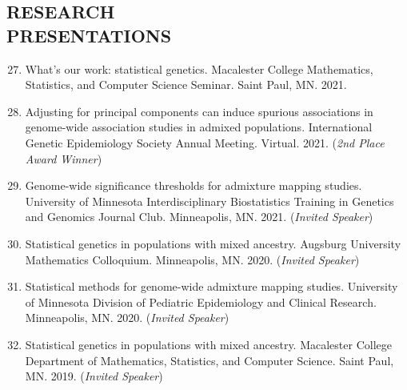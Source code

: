 \documentclass[margin]{res}
\newenvironment{benumerate}[1]{
    \let\oldItem\item
    \def\item{\addtocounter{enumi}{-2}\oldItem}
    
    \begin{enumerate}
    \setcounter{enumi}{#1}
    \addtocounter{enumi}{1}
}{
    \end{enumerate}
}
\begin{document}
\begin{resume}
\section{RESEARCH \\ PRESENTATIONS}

\begin{benumerate}{26} %


\item What's our work: statistical genetics. Macalester College Mathematics, Statistics, and Computer Science Seminar. Saint Paul, MN. 2021.

\item Adjusting for principal components can induce spurious associations in genome-wide association studies in admixed populations. International Genetic Epidemiology Society Annual Meeting. Virtual. 2021. (\textit{2nd Place Award Winner})

\item Genome-wide significance thresholds for admixture mapping studies. University of Minnesota Interdisciplinary Biostatistics Training in Genetics and Genomics Journal Club. Minneapolis, MN. 2021. (\textit{Invited Speaker})

\item Statistical genetics in populations with mixed ancestry. Augsburg University Mathematics Colloquium. Minneapolis, MN. 2020. (\textit{Invited Speaker})

\item Statistical methods for genome-wide admixture mapping studies. University of Minnesota Division of Pediatric Epidemiology and Clinical Research. Minneapolis, MN. 2020. (\textit{Invited Speaker})

\item Statistical genetics in populations with mixed ancestry. Macalester College Department of Mathematics, Statistics, and Computer Science. Saint Paul, MN. 2019. (\textit{Invited Speaker})



\end{benumerate}
\end{resume}
\end{document}
